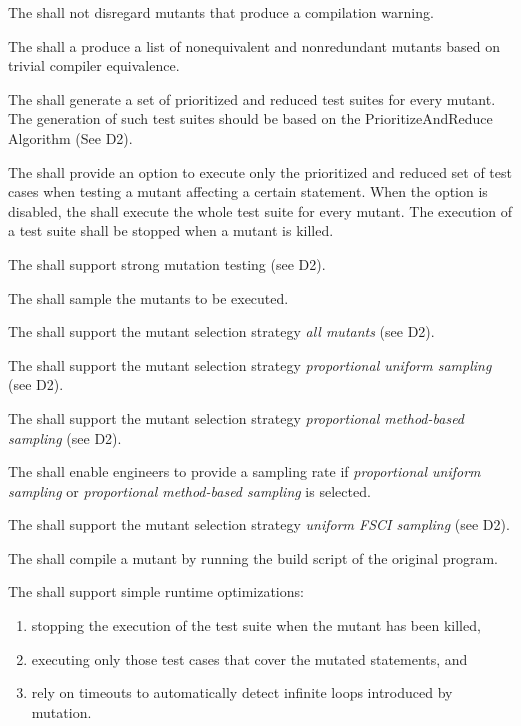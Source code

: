 \RQ{} The \FAQAS shall not disregard mutants that produce a compilation warning.

\RQ{} The \FAQAS shall a produce a list of nonequivalent and nonredundant mutants based on trivial compiler equivalence.

\RQ{} The \FAQAS shall generate a set of prioritized and reduced test suites for every mutant.
The generation of such test suites should be  based on the PrioritizeAndReduce Algorithm (See D2).

\RQ{} The \FAQAS shall provide an option to execute only the prioritized and reduced set of test cases when testing a mutant affecting a certain statement. When the option is disabled, the \FAQAS shall execute the whole test suite for every mutant. The execution of a test suite shall be stopped when a mutant is killed.

\RQ{} The \FAQAS shall support strong mutation testing (see D2).

\RQ{} The \FAQAS shall sample the mutants to be executed.

\RQ{} The \FAQAS shall support the mutant selection strategy \textit{all mutants} (see D2).

\RQ{} The \FAQAS shall support the mutant selection strategy \textit{proportional uniform sampling} (see D2).

\RQ{} The \FAQAS shall support the mutant selection strategy \textit{proportional method-based sampling} (see D2).

\RQ{} The \FAQAS shall enable engineers to provide a sampling rate if \textit{proportional uniform sampling} or \textit{proportional method-based sampling} is selected.

\RQ{} The \FAQAS shall support the mutant selection strategy \textit{uniform FSCI sampling} (see D2).

\RQ{} The \FAQAS shall compile a mutant by running the build script of the original program.

\RQ{} The \FAQAS shall support simple runtime optimizations:
\begin{enumerate}
	\item stopping the execution of the test suite when the mutant has been killed,
	\item executing only those test cases that cover the mutated statements, and
	\item rely on timeouts to automatically detect infinite loops introduced by mutation.
\end{enumerate}

